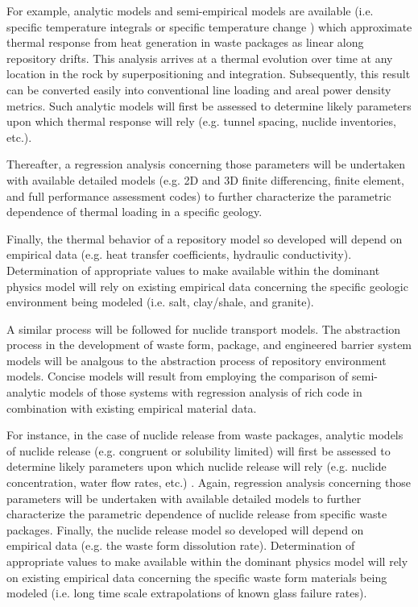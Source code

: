 For example, analytic models and semi-empirical models are available 
(i.e. specific temperature integrals \cite{li_methodology_2006} or 
specific temperature change \cite{radel_effect_2007}) which 
approximate thermal response from heat generation in waste packages as 
linear along repository drifts. This analysis arrives at a thermal 
evolution over time at any location in the rock by superpositioning 
and integration. Subsequently, this result can be converted easily 
into conventional line loading and areal power density metrics.  Such 
analytic models will first be assessed to determine likely parameters 
upon which thermal response will rely (e.g. tunnel spacing, nuclide 
inventories, etc.).

Thereafter, a regression analysis concerning those parameters will be 
undertaken with available detailed models (e.g. 2D and 3D finite 
differencing, finite element, and full performance assessment codes) 
to further characterize the parametric dependence of thermal loading 
in a specific geology.  

Finally, the thermal behavior of a repository model so developed will 
depend on empirical data (e.g.  heat transfer coefficients, hydraulic 
conductivity). Determination of appropriate values to make available 
within the dominant physics model will rely on existing empirical data 
concerning the specific geologic environment being modeled (i.e. salt, 
clay/shale, and granite). 

A similar process will be followed for nuclide transport models.  The 
abstraction process in the development of waste form, package, and 
engineered barrier system models will be analgous to the abstraction 
process of repository environment models. Concise models will result 
from employing the comparison of semi-analytic models of those systems 
with regression analysis of rich code in combination with existing 
empirical material data.

For instance, in the case of nuclide release from waste packages, 
analytic models of nuclide release (e.g.  congruent or solubility 
limited) will first be assessed to determine likely parameters upon 
which nuclide release will rely (e.g.  nuclide concentration, water 
flow rates, etc.) \cite{kawasaki_congruent_2004}.  Again, regression 
analysis concerning those parameters will be undertaken with available 
detailed models to further characterize the parametric dependence of 
nuclide release from specific waste packages.  Finally, the nuclide 
release model so developed will depend on empirical data (e.g. the 
waste form dissolution rate).  Determination of appropriate values to 
make available within the dominant physics model will rely on existing 
empirical data concerning the specific waste form  materials being 
modeled (i.e. long time scale extrapolations of known glass failure 
rates).  

